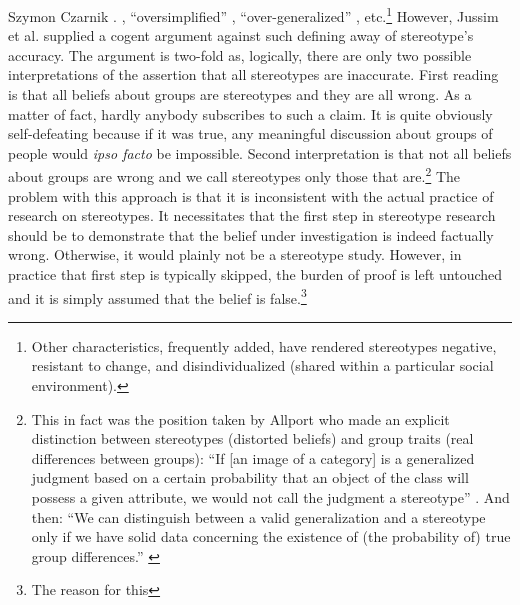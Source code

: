 \begin{artengenv}{Szymon Czarnik}
{%
\parencite[][p.16]{miller_expectancies_1986}.%
}, ``oversimplified'' 
\parencite[][]{koleser_stereotyping_2008}, %
 ``over-generalized'' 
\parencite[][]{wikipedia_stereotype_2020}, %
 etc.\footnote{Other characteristics, frequently added, have rendered stereotypes negative, resistant to change, and disindividualized (shared within a particular social environment).} However, Jussim et al. 
\enlargethispage{-.5\baselineskip}%
\parencite*[][]{jussim_unbearable_2009} %
 supplied a cogent argument against such defining away of stereotype's accuracy. The argument is two-fold as, logically, there are only two possible interpretations of the assertion that all stereotypes are inaccurate. First reading is that all beliefs about groups are stereotypes and they are all wrong. As a matter of fact, hardly anybody subscribes to such a claim. It is quite obviously self-defeating because if it was true, any meaningful discussion about groups of people would \textit{ipso facto} be impossible. Second interpretation is that not all beliefs about groups are wrong and we call stereotypes only those that are.\footnote{This in fact was the position taken by Allport who made an explicit distinction between stereotypes (distorted beliefs) and group traits (real differences between groups): ``If [an image of a category] is a generalized judgment based on a certain probability that an object of the class will possess a given attribute, we would not call the judgment a stereotype'' 
\parencite[][p.189]{allport_nature_1954}. %
 And then: ``We can distinguish between a valid generalization and a stereotype only if we have solid data concerning the existence of (the probability of) true group differences.'' 
\parencite[][p.192]{allport_nature_1954}}
 The problem with this approach is that it is inconsistent with the actual practice of research on stereotypes. It necessitates that the first step in stereotype research should be to demonstrate that the belief under investigation is indeed factually wrong. Otherwise, it would plainly not be a stereotype study. However, in practice that first step is typically skipped, the burden of proof is left untouched and it is simply assumed that the belief is false.\footnote{The reason for this
}
\end{artengenv}
